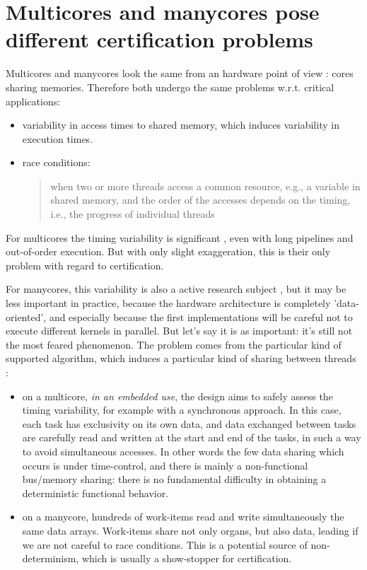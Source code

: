 \documentclass[a4paper,10pt]{article} %
\begin{document}
\section{Multicores and manycores pose different certification problems}

Multicores and manycores look the same from an hardware point of view : cores sharing memories.
Therefore both undergo the same problems w.r.t. critical applications:
\begin{itemize}
\item
variability in access times to shared memory, which induces variability in execution times.
\item
race conditions: \cite{padua2011encyclopedia}
\begin{quotation}
when two or more threads access a common resource,
e.g., a variable in shared memory, and the order of the
accesses depends on the timing, i.e., the progress of
individual threads
\end{quotation}

\end{itemize}

For multicores the timing variability is significant \cite{cullmann2010predictability}, even with long pipelines and out-of-order execution. But with only slight exaggeration, this is their only problem with regard to certification.

For manycores, this variability is also a active research subject \cite{de2020scaling}, but it may be less important in practice, because the hardware architecture is completely 'data-oriented', and especially because the first implementations will be careful not to execute different kernels in parallel.
But let's say it is as important: it's still not the most feared phenomenon.
The problem comes from the particular kind of supported algorithm, which induces a particular kind of sharing between threads :
\begin{itemize}
\item on a multicore, \emph{in an embedded use}, the design aims to safely assess the timing variability, for example with a synchronous approach.
In this case, each task has exclusivity on its own data, and data exchanged between tasks are carefully read and written at the start and end of the tasks, in such a way to avoid simultaneous accesses.
In other words the few data sharing which occurs is under time-control, and there is mainly a non-functional bus/memory sharing:
there is no fundamental difficulty in obtaining a deterministic functional behavior.
\item on a manycore, hundreds of work-items read and write simultaneously the same data arrays. Work-items share not only organs, but also data, leading if we are not careful to {race conditions}. This is a potential source of non-determinism, which is usually a show-stopper for certification.
\end{itemize}
\end{document}
